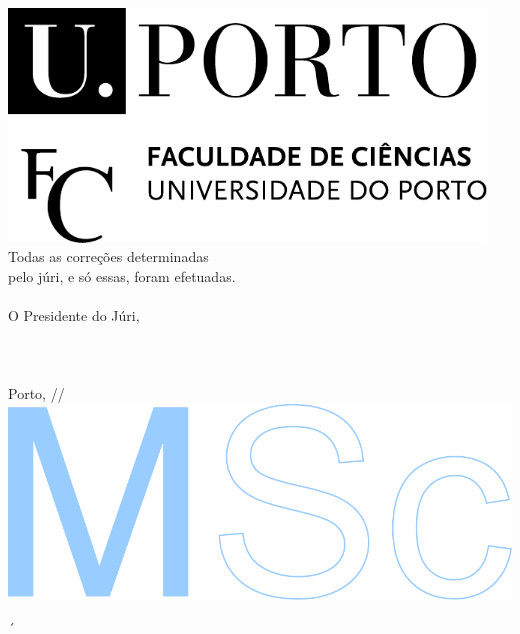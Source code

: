 \documentclass[11pt]{article}
\begin{document}
\begin{flushright}
	\vspace*{\fill}
	\begin{minipage}[b]{54mm}
		\includegraphics[width=0.95\textwidth]{fcup}
		\\[0.5em]
		{ \footnotesize Todas as correções determinadas \\
			pelo júri, e só essas, foram efetuadas. \\
			\\
			O Presidente do Júri, \\
			\\ 
			\\
			\\
			Porto, \underline{\qquad\quad}/\underline{\quad\qquad}/\underline{\qquad\qquad} \\
		}
		\includegraphics[angle=-90,scale=0.97]{msc}
	\end{minipage}
	\vspace*{1mm}
\end{flushright}

\newpage
´



\end{document}
